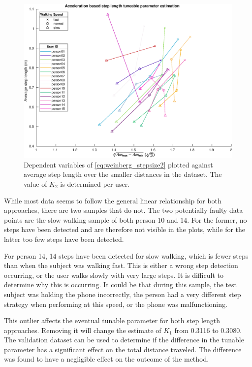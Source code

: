 \begin{figure}[h]
	\centering
	\includegraphics[width=0.8\linewidth]{images/20201128_1317_}
	\setlength{\belowcaptionskip}{-10pt}
	\caption{Dependent variables of \eqref{eq:weinberg_stepsize2} plotted against average step length over the smaller distances in the \citet{Vezocnik2019} dataset. The value of $ K_2 $ is determined per user.}
	\label{fig:step_length_weinberg}
\end{figure}

While most data seems to follow the general linear relationship for both approaches, there are two samples that do not. The two potentially faulty data points are the slow walking sample of both person 10 and 14. For the former, no steps have been detected and are therefore not visible in the plots, while for the latter too few steps have been detected. \par 

For person 14, 14 steps have been detected for slow walking, which is fewer steps than when the subject was walking fast. This is either a wrong step detection occurring, or the user walks slowly with very large steps. It is difficult to determine why this is occurring. It could be that during this sample, the test subject was holding the phone incorrectly, the person had a very different step strategy when performing at this speed, or the phone was malfunctioning. \par 

This outlier affects the eventual tunable parameter for both step length approaches. Removing it will change the estimate of $K_1$ from 0.3116 to 0.3080. The validation dataset can be used to determine if the difference in the tunable parameter has a significant effect on the total distance traveled. The difference was found to have a negligible effect on the outcome of the method.


